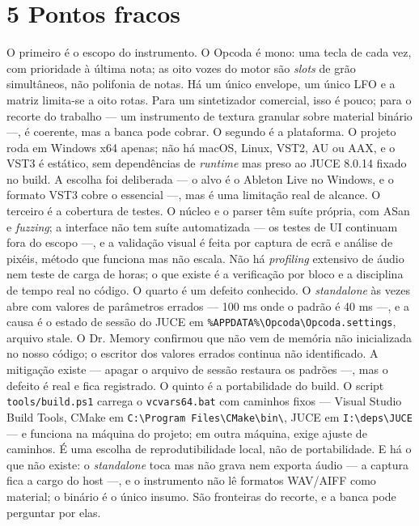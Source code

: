 \documentclass[11pt,a4paper]{article}
\newcommand{\code}[1]{\texttt{\small #1}}
\begin{document}
\section*{5 Pontos fracos}
O primeiro é o escopo do instrumento. O Opcoda é mono: uma tecla de cada vez, com prioridade à última nota; as oito vozes do motor são \emph{slots} de grão simultâneos, não polifonia de notas. Há um único envelope, um único LFO e a matriz limita-se a oito rotas. Para um sintetizador comercial, isso é pouco; para o recorte do trabalho --- um instrumento de textura granular sobre material binário ---, é coerente, mas a banca pode cobrar. O segundo é a plataforma. O projeto roda em Windows x64 apenas; não há macOS, Linux, VST2, AU ou AAX, e o VST3 é estático, sem dependências de \emph{runtime} mas preso ao JUCE 8.0.14 fixado no build. A escolha foi deliberada --- o alvo é o Ableton Live no Windows, e o formato VST3 cobre o essencial ---, mas é uma limitação real de alcance. O terceiro é a cobertura de testes. O núcleo e o parser têm suíte própria, com ASan e \emph{fuzzing}; a interface não tem suíte automatizada --- os testes de UI continuam fora do escopo ---, e a validação visual é feita por captura de ecrã e análise de pixéis, método que funciona mas não escala. Não há \emph{profiling} extensivo de áudio nem teste de carga de horas; o que existe é a verificação por bloco e a disciplina de tempo real no código. O quarto é um defeito conhecido. O \emph{standalone} às vezes abre com valores de parâmetros errados --- 100 ms onde o padrão é 40 ms ---, e a causa é o estado de sessão do JUCE em \code{\%APPDATA\%\textbackslash{}Opcoda\textbackslash{}Opcoda.settings}, arquivo stale. O Dr. Memory confirmou que não vem de memória não inicializada no nosso código; o escritor dos valores errados continua não identificado. A mitigação existe --- apagar o arquivo de sessão restaura os padrões ---, mas o defeito é real e fica registrado. O quinto é a portabilidade do build. O script \code{tools/build.ps1} carrega o \code{vcvars64.bat} com caminhos fixos --- Visual Studio Build Tools, CMake em \code{C:\textbackslash{}Program Files\textbackslash{}CMake\textbackslash{}bin\textbackslash{}}, JUCE em \code{I:\textbackslash{}deps\textbackslash{}JUCE} --- e funciona na máquina do projeto; em outra máquina, exige ajuste de caminhos. É uma escolha de reprodutibilidade local, não de portabilidade. E há o que não existe: o \emph{standalone} toca mas não grava nem exporta áudio --- a captura fica a cargo do host ---, e o instrumento não lê formatos WAV/AIFF como material; o binário é o único insumo. São fronteiras do recorte, e a banca pode perguntar por elas.
\end{document}
